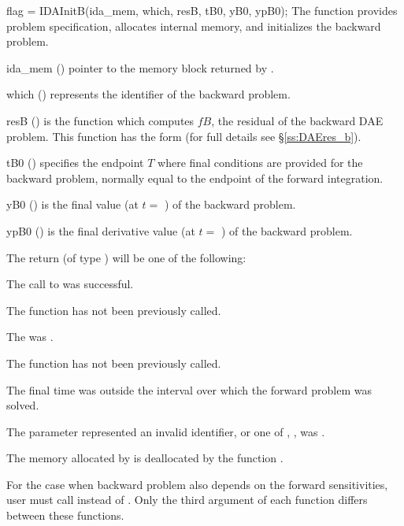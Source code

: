 {
  flag = IDAInitB(ida\_mem, which, resB, tB0, yB0, ypB0);
}
{
  The function  provides problem specification, allocates internal memory, 
  and initializes the backward problem.
}
{
  \begin{args}
  \item[ida\_mem] ()
    pointer to the {\idas} memory block returned by .
  \item[which] ()
    represents the identifier of the backward problem.
  \item[resB] ()
    is the {\C} function which computes $fB$, the residual of the 
    backward DAE problem. This function has the form 
     (for full details see
    \S\ref{ss:DAEres_b}).
  \item[tB0] ()
    specifies the endpoint $T$ where final conditions are provided for the backward
    problem, normally equal to the endpoint of the forward integration.
  \item[yB0] ()
    is the final value (at $t =$ ) of the backward problem. 
  \item[ypB0] ()
    is the final derivative value (at $t =$ ) of the backward problem. 
  \end{args}
}
{
  The return  (of type ) will be one of the following:
  \begin{args}
  \item[\Id{IDA\_SUCCESS}]
    The call to  was successful.
  \item[\Id{IDA\_NO\_MALLOC}]
    The function  has not been previously called.
  \item[\Id{IDA\_MEM\_NULL}]
    The  was .
  \item[\Id{IDA\_NO\_ADJ}]
    The function  has not been previously called.
  \item[\Id{IDA\_BAD\_TB0}]
    The final time  was outside the interval over which the forward problem
    was solved.
  \item[\Id{IDA\_ILL\_INPUT}]
    The parameter  represented an invalid identifier, or one
    of , ,  was .
  \end{args}
}
{
  The memory allocated by  is deallocated by the function 
  .
}

For the case when backward problem also depends on the forward sensitivities, user
must call  instead of . Only the third argument of each
function differs between these functions.


